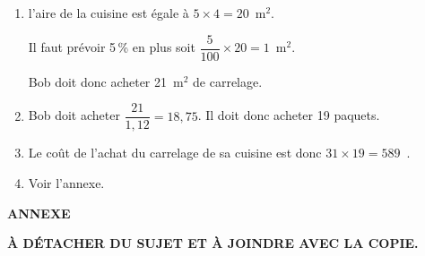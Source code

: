 \documentclass[10pt]{article}
\begin{document}
\setlength\parindent{0mm}
\pagestyle{fancy}
\thispagestyle{empty}
    
    
    




\medskip

%
%

\begin{enumerate}
\item %
l'aire de la cuisine est égale à $5 \times 4 = 20$~m$^2$.

Il faut prévoir 5\,\% en plus soit $\dfrac{5}{100}\times 20 = 1$~m$^2$.

Bob doit donc acheter 21~m$^2$ de carrelage.
\item %
Bob doit acheter $\dfrac{21}{1,12} = 18,75$. Il doit donc acheter 19 paquets.

\item %
Le coût de l'achat du carrelage de sa cuisine est donc $31 \times 19 = 589$~\EUR.
\item  %

Voir l'annexe.
\end{enumerate}
\bigskip

\begin{center}
\textbf{ANNEXE }

\textbf{À DÉTACHER DU SUJET ET À JOINDRE AVEC LA COPIE. }
\end{center}
\end{document}
